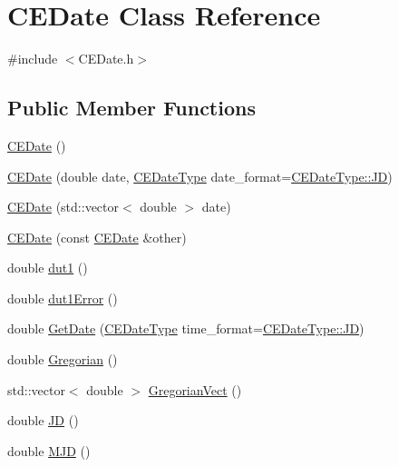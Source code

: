 \hypertarget{class_c_e_date}{}\section{C\+E\+Date Class Reference}
\label{class_c_e_date}


{\ttfamily \#include $<$C\+E\+Date.\+h$>$}

\subsection*{Public Member Functions}
\begin{DoxyCompactItemize}
\item 
\hyperlink{class_c_e_date_a26bb1483e185a10594e82aa622499367}{C\+E\+Date} ()
\item 
\hyperlink{class_c_e_date_a42ecf58a60d59f5919f98e82b7a3d6cd}{C\+E\+Date} (double date, \hyperlink{_c_e_date_8h_aa6b826beca26b0712061a4afc5ad7746}{C\+E\+Date\+Type} date\+\_\+format=\hyperlink{_c_e_date_8h_aa6b826beca26b0712061a4afc5ad7746aabf8d7515962e526421842e8456798cc}{C\+E\+Date\+Type\+::\+J\+D})
\item 
\hyperlink{class_c_e_date_a65721845bff2f508fe90ee78b8151f38}{C\+E\+Date} (std\+::vector$<$ double $>$ date)
\item 
\hyperlink{class_c_e_date_a6ea4a0f640de5044d005b0eb2dcb74ea}{C\+E\+Date} (const \hyperlink{class_c_e_date}{C\+E\+Date} \&other)
\item 
double \hyperlink{class_c_e_date_aa59d415dc6ea36d3fe1b09c291c7ca5c}{dut1} ()
\item 
double \hyperlink{class_c_e_date_ae18b0156d19e87569df525588b6c8c51}{dut1\+Error} ()
\item 
double \hyperlink{class_c_e_date_a4c362a8bc9738240a6820821e4d11949}{Get\+Date} (\hyperlink{_c_e_date_8h_aa6b826beca26b0712061a4afc5ad7746}{C\+E\+Date\+Type} time\+\_\+format=\hyperlink{_c_e_date_8h_aa6b826beca26b0712061a4afc5ad7746aabf8d7515962e526421842e8456798cc}{C\+E\+Date\+Type\+::\+J\+D})
\item 
double \hyperlink{class_c_e_date_a3e72cb2a53b0e29a12bc0b2f7adbefda}{Gregorian} ()
\item 
std\+::vector$<$ double $>$ \hyperlink{class_c_e_date_a5e9fa4dd96005e66a8dbddc77efc9b72}{Gregorian\+Vect} ()
\item 
double \hyperlink{class_c_e_date_ae2037afc1279464fa1224b81226a3c41}{J\+D} ()
\item 
double \hyperlink{class_c_e_date_a587a14c0515697ef8c976ee8b67f40e4}{M\+J\+D} ()

\end{DoxyCompactItemize}
